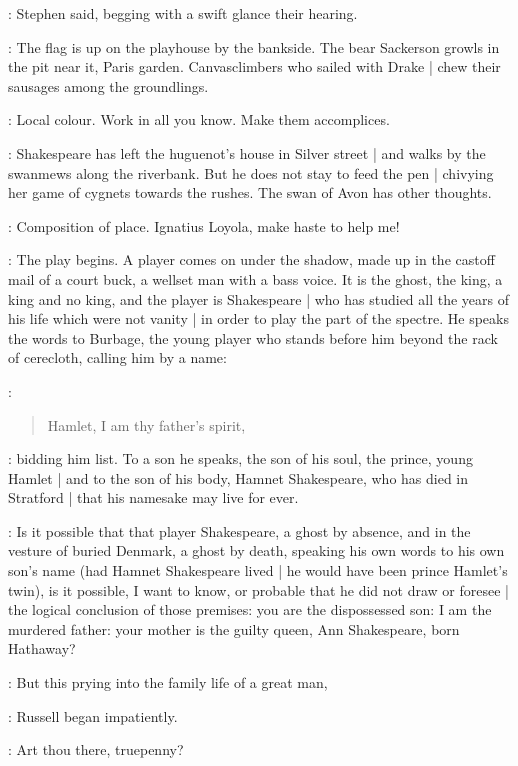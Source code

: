 :
Stephen said,
begging with a swift glance their hearing.

\Stephen:
The flag is up on the playhouse by the bankside.
The bear Sackerson growls in the pit near it,
Paris garden.
Canvasclimbers who sailed with Drake |
chew their sausages among the groundlings.

\StephenInt:
Local colour.
Work in all you know.
Make them accomplices.

\Stephen:
Shakespeare has left the huguenot's house in Silver street |
and walks by the swanmews along the riverbank.
But he does not stay to feed the pen |
chivying her game of cygnets towards the rushes.
The swan of Avon has other thoughts.

\StephenInt:
Composition of place.
Ignatius Loyola,
make haste to help me!

\Stephen:
The play begins.
A player comes on under the shadow,
made up in the castoff mail of a court buck,
a wellset man with a bass voice.
It is the ghost,
the king,
a king and no king,
and the player is Shakespeare |
who has studied  all the years of his life which were not vanity |
in order to play the part of the spectre.
He speaks the words to Burbage,
the young player who stands before him beyond the rack of cerecloth,
calling him by a name:

\Stephen:
\begin{verse}
    Hamlet, I am thy father's spirit,
\end{verse}

\Stephen:
bidding him list.
To a son he speaks,
the son of his soul,
the prince,
young Hamlet |
and to the son of his body,
Hamnet Shakespeare,
who has died in Stratford |
that his namesake may live for ever.

\Stephen:
Is it possible that that player Shakespeare,
a ghost by absence,
and in the vesture of buried Denmark,
a ghost by death,
speaking his own words to his own son's name
(had Hamnet Shakespeare lived |
he would have been prince Hamlet's twin),
is it possible,
I want to know,
or probable that he did not draw or foresee |
the logical conclusion of those premises:
you are the dispossessed son:
I am the murdered father:
your mother is the guilty queen,
Ann Shakespeare,
born Hathaway?

\AErussell:
But this prying into the family life of a great man,

:
Russell began impatiently.

\StephenInt:
Art thou there,
truepenny?

